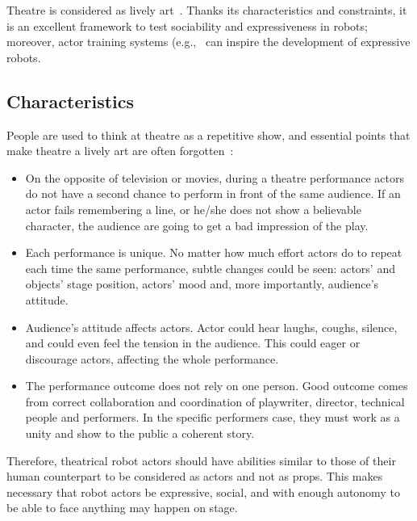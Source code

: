 Theatre is considered as lively art~\cite{wilson2009theatre}. Thanks its characteristics and constraints, it is an excellent framework to test sociability and expressiveness in robots; moreover, actor training systems (e.g.,~\cite{wilson2009theatre,cavanaugh2012acting,genevieve2009delsarte,Stanislavski1989} can inspire the development of expressive robots.
\subsection{Characteristics}
People are used to think at theatre as a repetitive show, and essential points that make theatre a lively art are often forgotten~\cite{wilson2009theatre}: 
\begin{itemize}
\item On the opposite of television or movies, during a theatre performance actors do not have a second chance to perform in front of the same audience. If an actor fails remembering a line, or he/she does not show a believable character, the audience are going to get a bad impression of the play.
\item Each performance is unique. No matter how much effort actors do to repeat each time the same performance, subtle changes could be seen: actors' and objects' stage position, actors' mood and, more importantly, audience's attitude. 
\item Audience's attitude affects actors. Actor could hear laughs, coughs, silence, and could even feel the tension in the audience. This could eager or discourage actors, affecting the whole performance. 
\item The performance outcome does not rely on one person. Good outcome comes from correct collaboration and coordination of playwriter, director, technical people and performers. In the specific performers case, they must work as a unity and show to the public a coherent story. 
\end{itemize}
Therefore, theatrical robot actors should have abilities similar to those of their human counterpart to be considered as actors and not as props. This makes necessary that robot actors be expressive, social, and with enough autonomy to be able to face anything may happen on stage.
